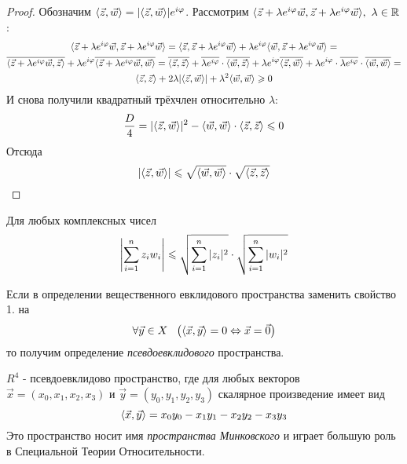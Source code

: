 \begin{proof}
	Обозначим $\langle\vec{z}, \vec{w}\rangle = |\langle\vec{z}, \vec{w}\rangle|e^{i\varphi}$. Рассмотрим $\langle\vec{z} + \lambda e^{i\varphi} \vec{w}, \vec{z} + \lambda e^{i\varphi} \vec{w}\rangle,\ \lambda \in \mathbb{R}$:
	\begin{multline*}
		\langle\vec{z} + \lambda e^{i\varphi} \vec{w}, \vec{z} + \lambda e^{i\varphi} \vec{w}\rangle = \langle\vec{z}, \vec{z} + \lambda e^{i\varphi} \vec{w}\rangle + \lambda e^{i\varphi} \langle\vec{w}, \vec{z} + \lambda e^{i\varphi} \vec{w}\rangle =
		\\
		\overline{\langle\vec{z} + \lambda e^{i\varphi} \vec{w}, \vec{z}\rangle} + \lambda e^{i\varphi} \overline{\langle\vec{z} + \lambda e^{i\varphi} \vec{w}, \vec{w}\rangle} = \overline{\langle\vec{z}, \vec{z}\rangle} + \overline{\lambda e^{i \varphi}} \cdot \overline{\langle\vec{w}, \vec{z}\rangle} + \lambda e^{i\varphi} \overline{\langle\vec{z}, \vec{w}\rangle} + \lambda e^{i\varphi} \cdot \overline{\lambda e^{i\varphi}} \cdot \overline{\langle\vec{w}, \vec{w}\rangle} =
		\\
		\langle\vec{z}, \vec{z}\rangle + 2\lambda |\langle\vec{z}, \vec{w}\rangle| + \lambda^2 \langle\vec{w}, \vec{w}\rangle \geqslant 0
	\end{multline*}
	И снова получили квадратный трёхчлен относительно $\lambda$:
	\[
		\frac{D}{4} = |\langle\vec{z}, \vec{w}\rangle|^2 - \langle\vec{w}, \vec{w}\rangle \cdot \langle\vec{z}, \vec{z}\rangle \leqslant 0
	\]
	Отсюда
	\[
		|\langle\vec{z}, \vec{w}\rangle| \leqslant \sqrt{\langle\vec{w}, \vec{w}\rangle} \cdot \sqrt{\langle\vec{z}, \vec{z}\rangle}
	\]
\end{proof}

\begin{corollary}
	Для любых комплексных чисел
	\[
		\left|\sum\limits_{i = 1}^n z_i w_i\right| \leqslant \sqrt{\sum\limits_{i = 1}^n |z_i|^2} \cdot \sqrt{\sum\limits_{i = 1}^n |w_i|^2}
	\]
\end{corollary}

\begin{addition}
	Если в определении вещественного евклидового пространства заменить свойство 1. на
	\[
		\forall \vec{y} \in X\ \ \left(\trbr{\vec{x}, \vec{y}} = 0 \lra \vec{x} = \vec{0}\right)
	\]
	то получим определение \textit{псевдоевклидового} пространства.
\end{addition}

\begin{example}
	$R^4$ - псевдоевклидово пространство, где для любых векторов $\vec{x} = (x_0, x_1, x_2, x_3)$ и $\vec{y} = (y_0, y_1, y_2, y_3)$ скалярное произведение имеет вид
	\[
		\langle\vec{x}, \vec{y}\rangle = x_0 y_0 - x_1 y_1 - x_2 y_2 - x_3 y_3
	\]
	Это пространство носит имя \textit{пространства Минковского} и играет большую роль в Специальной Теории Относительности.
\end{example}

